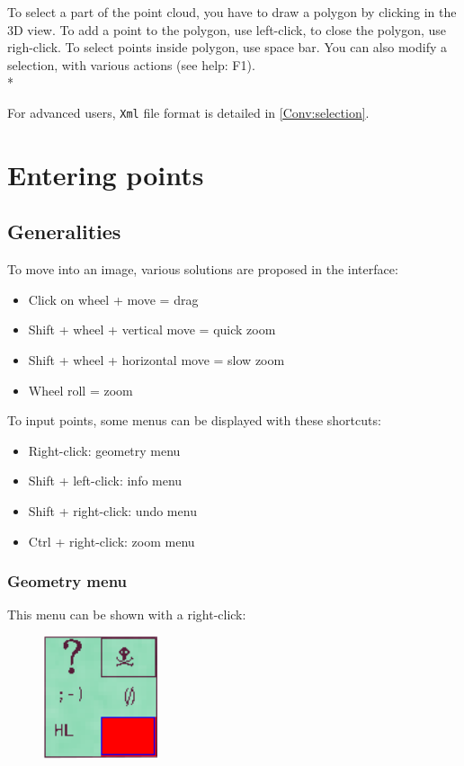 To select a part of the point cloud, you have to draw a polygon by clicking in the 3D view. To add a point to the polygon, use left-click, to close the polygon, use righ-click. To select points inside polygon, use space bar.
You can also modify a selection, with various actions (see help: F1).\\*

For advanced users, {\tt Xml} file format is detailed in \ref{Conv:selection}.


\section{Entering points}

\subsection{Generalities}


To move into an image, various solutions are proposed in the interface:
\begin{itemize}
\item Click on wheel + move = drag
\item Shift + wheel + vertical move = quick zoom
\item Shift + wheel + horizontal move = slow zoom
\item Wheel roll = zoom
\end{itemize}

\vspace{\baselineskip}
To input points, some menus can be displayed with these shortcuts:
\begin{itemize}
\item Right-click: geometry menu
\item Shift + left-click: info menu
\item Shift + right-click: undo menu
\item Ctrl + right-click: zoom menu
\end{itemize}

\subsubsection{Geometry menu}

This menu can be shown with a right-click:

\begin{figure}[H]
\begin{center}
\includegraphics[width=95pt]{FIGS/Saisie/geometry.png}
\end{center}
\label{FIG:button1}
\end{figure}

